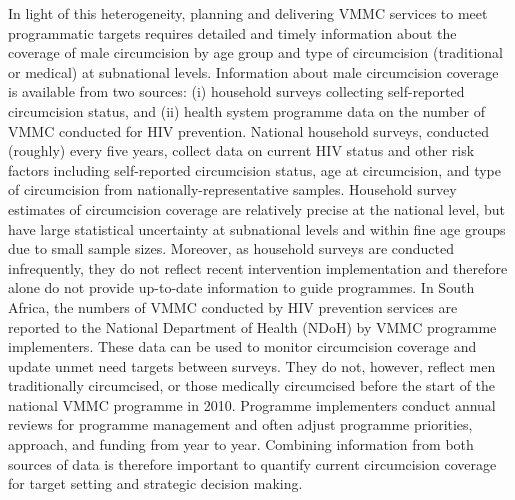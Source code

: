 \documentclass{article}
\begin{document}
In light of this heterogeneity, planning and delivering VMMC services to meet programmatic targets requires detailed and timely information about the coverage of male circumcision by age group and type of circumcision (traditional or medical) at subnational levels. Information about male circumcision coverage is available from two sources: (i) household surveys collecting self-reported circumcision status, and (ii) health system programme data on the number of VMMC conducted for HIV prevention. National household surveys, conducted (roughly) every five years, collect data on current HIV status and other risk factors including self-reported circumcision status, age at circumcision, and type of circumcision from nationally-representative samples. Household survey estimates of circumcision coverage are relatively precise at the national level, but have large statistical uncertainty at subnational levels and within fine age groups due to small sample sizes. Moreover, as household surveys are conducted infrequently, they do not reflect recent intervention implementation and therefore alone do not provide up-to-date information to guide programmes. In South Africa, the numbers of VMMC conducted by HIV prevention services are reported to the National Department of Health (NDoH) by VMMC programme implementers. These data can be used to monitor circumcision coverage and update unmet need targets between surveys. They do not, however, reflect men traditionally circumcised, or those medically circumcised before the start of the national VMMC programme in 2010. Programme implementers conduct annual reviews for programme management and often adjust programme priorities, approach, and funding from year to year. Combining information from both sources of data is therefore important to quantify current circumcision coverage for target setting and strategic decision making.
\end{document}
